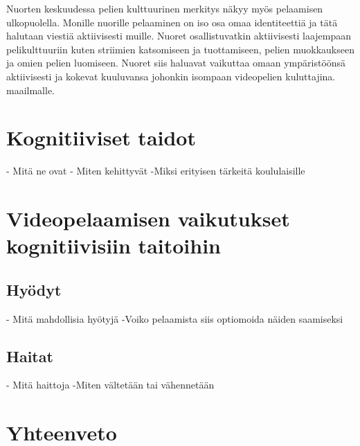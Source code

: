 \documentclass[utf8,bachelor]{gradu3}
\begin{document}
Nuorten keskuudessa pelien kulttuurinen merkitys näkyy myös pelaamisen ulkopuolella. Monille nuorille pelaaminen on iso osa omaa identiteettiä ja tätä halutaan viestiä aktiivisesti muille. Nuoret osallistuvatkin aktiivisesti laajempaan pelikulttuuriin kuten striimien katsomiseen ja tuottamiseen, pelien muokkaukseen ja omien pelien luomiseen. Nuoret siis haluavat vaikuttaa omaan ympäristöönsä aktiivisesti ja kokevat kuuluvansa johonkin isompaan videopelien kuluttajina. maailmalle.\parencite{laakso2023lasten}  

\chapter{Kognitiiviset taidot}
- Mitä ne ovat
- Miten kehittyvät
-Miksi erityisen tärkeitä koululaisille

\chapter{Videopelaamisen vaikutukset kognitiivisiin taitoihin}

\section{Hyödyt}
- Mitä mahdollisia hyötyjä
-Voiko pelaamista siis optiomoida näiden saamiseksi

\section{Haitat}
- Mitä haittoja
-Miten vältetään tai vähennetään

\chapter{Yhteenveto}

\printbibliography
\end{document}
